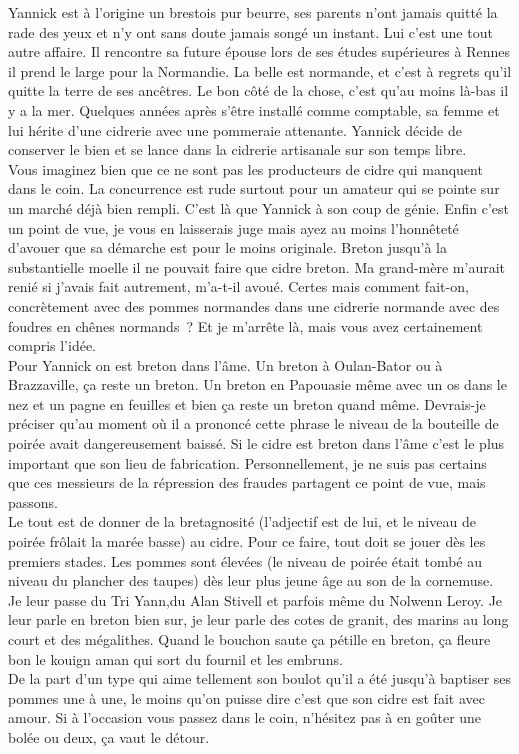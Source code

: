 Yannick est à l’origine un brestois pur beurre, ses parents n’ont jamais quitté la rade des yeux et n’y ont sans doute jamais songé un instant. Lui c’est une tout autre affaire. Il rencontre sa future épouse lors de ses études supérieures à Rennes il prend le large pour la Normandie. La belle est normande, et c’est à regrets qu’il quitte la terre de ses ancêtres. Le bon côté de la chose, c’est qu’au moins là-bas il y a la mer. Quelques années après s’être installé comme comptable, sa femme et lui hérite d’une cidrerie avec une pommeraie attenante. Yannick décide de conserver le bien et se lance dans la cidrerie artisanale sur son temps libre.\\
Vous imaginez bien que ce ne sont pas les producteurs de cidre qui manquent dans le coin. La concurrence est rude surtout pour un amateur qui se pointe sur un marché déjà bien rempli. C’est là que Yannick à son coup de génie. Enfin c’est un point de vue, je vous en laisserais juge mais ayez au moins l’honnêteté d’avouer que sa démarche est pour le moins originale. Breton jusqu’à la substantielle moelle il ne pouvait faire que cidre breton. Ma grand-mère m’aurait renié si j’avais fait autrement, m’a-t-il avoué. Certes mais comment fait-on, concrètement avec des pommes normandes dans une cidrerie normande avec des foudres en chênes normands ? Et je m’arrête là, mais vous avez certainement compris l’idée.\\

Pour Yannick on est breton dans l’âme. Un breton à Oulan-Bator ou à Brazzaville, ça reste un breton. Un breton en Papouasie même avec un os dans le nez et un pagne en feuilles et bien ça reste un breton quand même. Devrais-je préciser qu’au moment où il a prononcé cette phrase le niveau de la bouteille de poirée avait dangereusement baissé. Si le cidre est breton dans l’âme c’est le plus important que son lieu de fabrication. Personnellement, je ne suis pas certains que ces messieurs de la répression des fraudes partagent ce point de vue, mais passons.\\
Le tout est de donner de la bretagnosité (l’adjectif est de lui, et le niveau de poirée frôlait la marée basse) au cidre. Pour ce faire, tout doit se jouer dès les premiers stades. Les pommes sont élevées (le niveau de poirée était tombé au niveau du plancher des taupes) dès leur plus jeune âge au son de la cornemuse.\\ Je leur passe du Tri Yann,du Alan Stivell et parfois même du Nolwenn Leroy. Je leur parle en breton bien sur, je leur parle des cotes de granit, des marins au long court et des mégalithes. Quand le bouchon saute ça pétille en breton, ça fleure bon le kouign aman qui sort du fournil et les embruns.\\

De la part d’un type qui aime tellement son boulot qu’il a été jusqu’à baptiser ses pommes une à une, le moins qu’on puisse dire c’est que son cidre est fait avec amour. Si à l’occasion vous passez dans le coin, n’hésitez pas à en goûter une bolée ou deux, ça vaut le détour.
